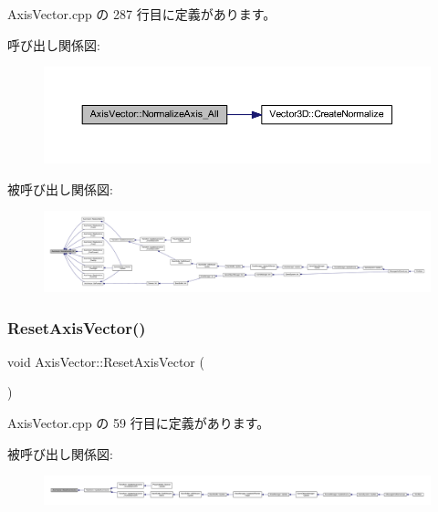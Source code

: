  Axis\+Vector.\+cpp の 287 行目に定義があります。

呼び出し関係図\+:
\nopagebreak
\begin{figure}[H]
\begin{center}
\leavevmode
\includegraphics[width=350pt]{class_axis_vector_abd3b0ec608bc18dc9996cf9fa1d121b0_cgraph}
\end{center}
\end{figure}
被呼び出し関係図\+:
\nopagebreak
\begin{figure}[H]
\begin{center}
\leavevmode
\includegraphics[width=350pt]{class_axis_vector_abd3b0ec608bc18dc9996cf9fa1d121b0_icgraph}
\end{center}
\end{figure}
\mbox{\label{class_axis_vector_a1414c1390a31d9e98c26d9803c61d2b8}} 
\subsubsection{\texorpdfstring{Reset\+Axis\+Vector()}{ResetAxisVector()}}
{\footnotesize\ttfamily void Axis\+Vector\+::\+Reset\+Axis\+Vector (\begin{DoxyParamCaption}{ }\end{DoxyParamCaption})}



 Axis\+Vector.\+cpp の 59 行目に定義があります。

被呼び出し関係図\+:
\nopagebreak
\begin{figure}[H]
\begin{center}
\leavevmode
\includegraphics[width=350pt]{class_axis_vector_a1414c1390a31d9e98c26d9803c61d2b8_icgraph}
\end{center}
\end{figure}
\mbox{\label{class_axis_vector_a42872a62f656e7249af84e39fd519475}} 
